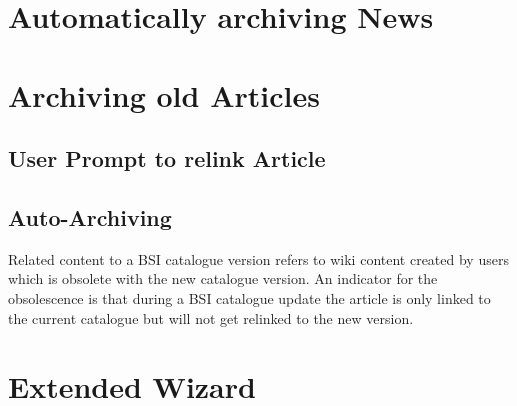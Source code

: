 \section{Automatically archiving News}



\section{Archiving old Articles}
\subsection{User Prompt to relink Article}

\subsection{Auto-Archiving}
\label{archive_relcon}
Related content to a BSI catalogue version refers to wiki content created by users which is obsolete with the new catalogue version. 
An indicator for the obsolescence is that during a BSI catalogue update the article is only linked to the current catalogue but will not get relinked to the new version.


\section{Extended Wizard}

